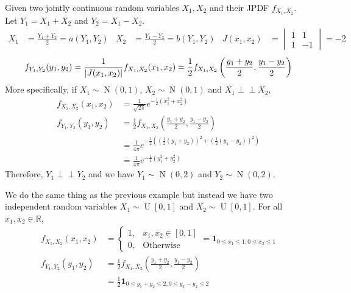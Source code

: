 \documentclass{huhtakm-template-book}
\newcommand{\independent}{\perp\!\!\!\perp}
\DeclareMathOperator{\U}{U}
\DeclareMathOperator{\N}{N}
\begin{document}
\begin{eg}
	Given two jointly continuous random variables $X_{1},X_{2}$ and their JPDF $f_{X_{1},X_{2}}$.\\
	Let $Y_{1}=X_{1}+X_{2}$ and $Y_{2}=X_{1}-X_{2}$.
	\begin{align*}
		X_{1}&=\frac{Y_{1}+Y_{2}}{2}=a(Y_{1},Y_{2}) & X_{2}&=\frac{Y_{1}-Y_{2}}{2}=b(Y_{1},Y_{2}) & J(x_{1},x_{2})&=\begin{vmatrix}
			1 & 1\\
			1 & -1
		\end{vmatrix}=-2
	\end{align*}
	\begin{equation*}
		f_{Y_{1},Y_{2}}(y_{1},y_{2})=\frac{1}{\left|{J(x_{1},x_{2})}\right|}f_{X_{1},X_{2}}(x_{1},x_{2})=\frac{1}{2}f_{X_{1},X_{2}}\left(\frac{y_{1}+y_{2}}{2},\frac{y_{1}-y_{2}}{2}\right)
	\end{equation*}
	More specifically, if $X_{1}\sim\N(0,1)$, $X_{2}\sim\N(0,1)$ and $X_{1}\independent X_{2}$,
	\begin{align*}
		f_{X_{1},X_{2}}(x_{1},x_{2})&=\frac{1}{\sqrt{2\pi}}e^{-\frac{1}{2}(x_{1}^{2}+x_{2}^{2})}\\
		f_{Y_{1},Y_{2}}(y_{1},y_{2})&=\frac{1}{2}f_{X_{1},X_{2}}\left(\frac{y_{1}+y_{2}}{2},\frac{y_{1}-y_{2}}{2}\right)\\
		&=\frac{1}{4\pi}e^{-\frac{1}{2}\left(\left(\frac{1}{2}(y_{1}+y_{2})\right)^{2}+\left(\frac{1}{2}(y_{1}-y_{2})\right)^{2}\right)}\\
		&=\frac{1}{4\pi}e^{-\frac{1}{4}(y_{1}^{2}+y_{2}^{2})}
	\end{align*}
	Therefore, $Y_{1}\independent Y_{2}$ and we have $Y_{1}\sim\N(0,2)$ and $Y_{2}\sim\N(0,2)$.
\end{eg}

\newpage
\begin{eg}
	We do the same thing as the previous example but instead we have two independent random variables $X_{1}\sim\U[0,1]$ and $X_{2}\sim\U[0,1]$. For all $x_{1},x_{2}\in\mathbb{R}$,
	\begin{align*}
		f_{X_{1},X_{2}}(x_{1},x_{2})&=\begin{cases}
			1, &x_{1},x_{2}\in[0,1]\\
			0, &\text{Otherwise}
		\end{cases}=\mathbf{1}_{0\leq x_{1}\leq 1,0\leq x_{2}\leq 1}\\
		f_{Y_{1},Y_{2}}(y_{1},y_{2})&=\frac{1}{2}f_{X_{1},X_{2}}\left(\frac{y_{1}+y_{2}}{2},\frac{y_{1}-y_{2}}{2}\right)\\
		&=\frac{1}{2}\mathbf{1}_{0\leq y_{1}+y_{2}\leq 2,0\leq y_{1}-y_{2}\leq 2}
	\end{align*}
\end{eg}
\end{document}
